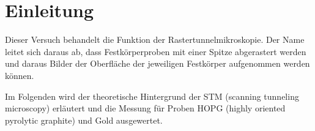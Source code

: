 \section{Einleitung}
Dieser Versuch behandelt die Funktion der Rastertunnelmikroskopie. Der Name leitet sich daraus ab, dass Festkörperproben mit einer Spitze abgerastert werden und daraus Bilder der Oberfläche der jeweiligen Festkörper aufgenommen werden können.

\noindent Im Folgenden wird der theoretische Hintergrund der STM (scanning tunneling microscopy) erläutert und die Messung für Proben HOPG (highly oriented pyrolytic graphite) und Gold ausgewertet.